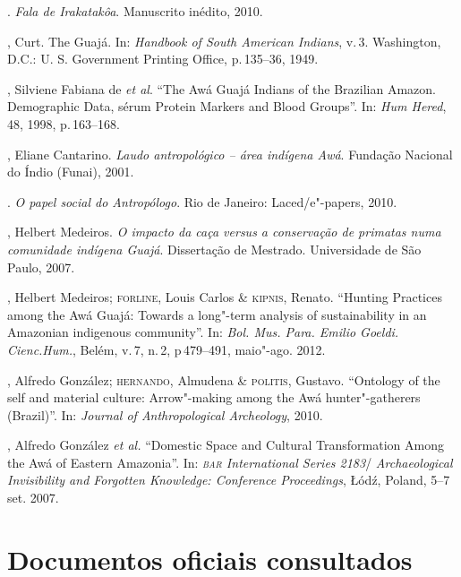 \begin{bibliohedra}
\titidem. \emph{Fala de Irakatakôa}. Manuscrito inédito, 2010.

, Curt. The Guajá. In: \emph{Handbook of South American
Indians}, v.\,3. Washington, D.C.: U. S. Government Printing Office, p.\,135--36, 1949.

, Silviene Fabiana de \emph{et al}.  ``The Awá Guajá Indians of
the Brazilian Amazon. Demographic Data, sérum Protein Markers and Blood
Groups''. In: \emph{Hum Hered}, 48, 1998, p.\,163--168.

, Eliane Cantarino. \emph{Laudo antropológico -- área
indígena Awá}. Fundação Nacional do Índio (Funai), 2001.

\titidem. \emph{O papel social do Antropólogo}.
Rio de Janeiro: Laced/e"-papers, 2010.

, Helbert Medeiros. \emph{O impacto da caça versus a conservação de
primatas numa comunidade indígena Guajá}. Dissertação de Mestrado.
Universidade de São Paulo, 2007.

, Helbert Medeiros; \textsc{forline}, Louis Carlos \& \textsc{kipnis}, Renato.
``Hunting Practices among the Awá Guajá: Towards a long"-term analysis of
sustainability in an Amazonian indigenous community''. In: \emph{Bol. Mus.
Para. Emilio Goeldi. Cienc.Hum.}, Belém, v.\,7, n.\,2, p\,479--491, maio"-ago. 2012.

, Alfredo González; \textsc{hernando}, Almudena \& \textsc{politis}, Gustavo.
``Ontology of the self and material culture: Arrow"-making among the Awá
hunter"-gatherers (Brazil)''. In: \emph{Journal of Anthropological
Archeology}, 2010.

, Alfredo González \emph{et al.} ``Domestic Space and Cultural Transformation
Among the Awá of Eastern Amazonia''. In: \emph{\textsc{bar} International Series
2183}/ \emph{Archaeological Invisibility and Forgotten Knowledge:
Conference Proceedings}, Łódź, Poland, 5--7 set. 2007.
\end{bibliohedra}


\section{Documentos oficiais consultados}

